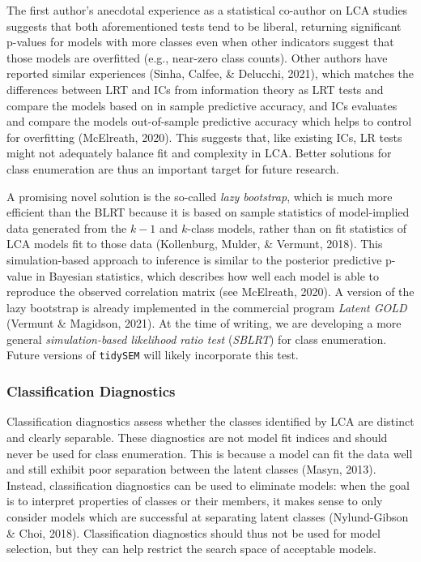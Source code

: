 \documentclass[
  ,man,floatsintext]{apa6}
\begin{document}
The first author's anecdotal experience as a statistical co-author on LCA studies suggests that both aforementioned tests tend to be liberal,
returning significant p-values for models with more classes even when other indicators suggest that those models are overfitted (e.g., near-zero class counts).
Other authors have reported similar experiences (Sinha, Calfee, \& Delucchi, 2021), which matches the differences between LRT and ICs from information theory as LRT tests and compare the models based on in sample predictive accuracy, and ICs evaluates and compare the models out-of-sample predictive accuracy which helps to control for overfitting (McElreath, 2020).
This suggests that, like existing ICs, LR tests might not adequately balance fit and complexity in LCA.
Better solutions for class enumeration are thus an important target for future research.

A promising novel solution is the so-called \emph{lazy bootstrap},
which is much more efficient than the BLRT because it is based on sample statistics of model-implied data generated from the \(k-1\) and \(k\)-class models,
rather than on fit statistics of LCA models fit to those data (Kollenburg, Mulder, \& Vermunt, 2018).
This simulation-based approach to inference is similar to the posterior predictive p-value in Bayesian statistics,
which describes how well each model is able to reproduce the observed correlation matrix (see McElreath, 2020).
A version of the lazy bootstrap is already implemented in the commercial program \emph{Latent GOLD} (Vermunt \& Magidson, 2021).
At the time of writing, we are developing a more general \emph{simulation-based likelihood ratio test} (\emph{SBLRT}) for class enumeration.
Future versions of \texttt{tidySEM} will likely incorporate this test.

\hypertarget{classification-diagnostics}{%
\subsubsection{Classification Diagnostics}\label{classification-diagnostics}}

Classification diagnostics assess whether the classes identified by LCA are distinct and clearly separable.
These diagnostics are not model fit indices and should never be used for class enumeration.
This is because a model can fit the data well and still exhibit poor separation between the latent classes (Masyn, 2013).
Instead, classification diagnostics can be used to eliminate models:
when the goal is to interpret properties of classes or their members,
it makes sense to only consider models which are successful at separating latent classes (Nylund-Gibson \& Choi, 2018).
Classification diagnostics should thus not be used for model selection, but they can help restrict the search space of acceptable models.
\end{document}
